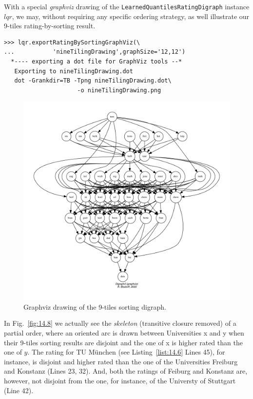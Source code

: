 With a special \emph{graphviz} drawing of the \texttt{LearnedQuantilesRatingDigraph} instance $lqr$, we may, without requiring any specific ordering strategy, as well illustrate our 9-tiles rating-by-sorting result.
\begin{lstlisting}
>>> lqr.exportRatingBySortingGraphViz(\
...           'nineTilingDrawing',graphSize='12,12')
  *---- exporting a dot file for GraphViz tools --*
   Exporting to nineTilingDrawing.dot
   dot -Grankdir=TB -Tpng nineTilingDrawing.dot\
                     -o nineTilingDrawing.png
\end{lstlisting}
\begin{figure}[ht]
\includegraphics[width=\hsize]{Figures/14-8-nineTilingDrawing.pdf}
\caption{Graphviz drawing of the 9-tiles sorting digraph.}
\label{fig:14.8}       %
\end{figure}

In Fig.~\vref{fig:14.8} we actually see the \emph{skeleton} (transitive closure removed) of a partial order, where an oriented arc is drawn between Universities x and y when their 9-tiles sorting results are disjoint and the one of x is higher rated than the one of $y$. The rating for TU München (see Listing~\vref{list:14.6} Lines 45), for instance, is disjoint and higher rated than the one of the Universities Freiburg and Konstanz (Lines 23, 32). And, both the ratings of Feiburg and Konstanz are, however, not disjoint from the one, for instance, of the Universty of Stuttgart (Line 42).

